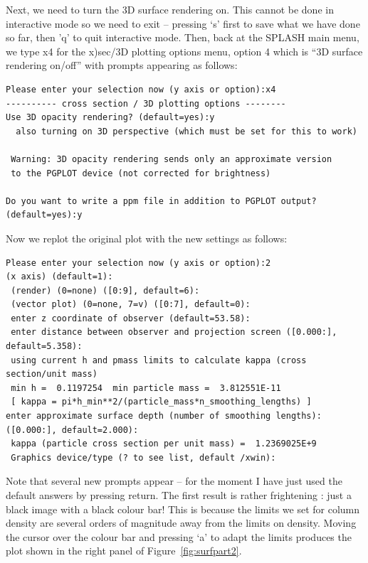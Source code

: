 \documentclass[a4paper,10pt]{article}
\newcommand{\splash}{\textsc{SPLASH }}
\begin{document}
 Next, we need to turn the 3D surface rendering on. This cannot be done in interactive mode so we need to exit -- pressing `s' first to save what we have done so far, then 'q' to quit interactive mode. Then, back at the \splash main menu, we type x4 for the x)sec/3D plotting options menu, option 4 which is ``3D surface rendering on/off'' with prompts appearing as follows:
\begin{verbatim}
Please enter your selection now (y axis or option):x4
---------- cross section / 3D plotting options --------
Use 3D opacity rendering? (default=yes):y
  also turning on 3D perspective (which must be set for this to work)

 Warning: 3D opacity rendering sends only an approximate version 
 to the PGPLOT device (not corrected for brightness) 

Do you want to write a ppm file in addition to PGPLOT output? (default=yes):y
\end{verbatim}
Now we replot the original plot with the new settings as follows:
\begin{verbatim}
Please enter your selection now (y axis or option):2
(x axis) (default=1):
 (render) (0=none) ([0:9], default=6):
 (vector plot) (0=none, 7=v) ([0:7], default=0):
 enter z coordinate of observer (default=53.58):
 enter distance between observer and projection screen ([0.000:], default=5.358):
 using current h and pmass limits to calculate kappa (cross section/unit mass)
 min h =  0.1197254  min particle mass =  3.812551E-11
 [ kappa = pi*h_min**2/(particle_mass*n_smoothing_lengths) ]
enter approximate surface depth (number of smoothing lengths): ([0.000:], default=2.000):
 kappa (particle cross section per unit mass) =  1.2369025E+9
 Graphics device/type (? to see list, default /xwin): 
\end{verbatim}
Note that several new prompts appear -- for the moment I have just used the default answers by pressing return. The first result is rather frightening : just a black image with a black colour bar! This is because the limits we set for column density are several orders of magnitude away from the limits on density. Moving the cursor over the colour bar and pressing `a' to adapt the limits produces the plot shown in the right panel of Figure~\ref{fig:surfpart2}.
\end{document}
